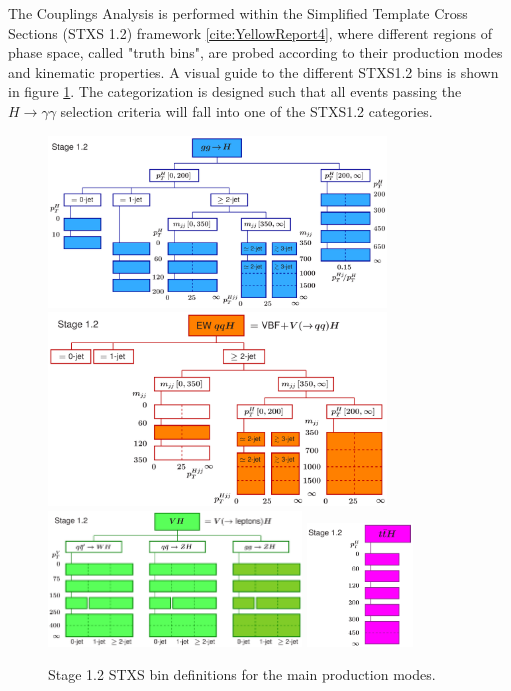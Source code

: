 The Couplings Analysis is performed within the Simplified Template Cross Sections (STXS 1.2) framework \ref{cite:YellowReport4}, where different regions of phase space, called "truth bins", are probed according to their production modes and kinematic properties. A visual guide to the different STXS1.2 bins is shown in figure \ref{fig:STXS_scheme}. The categorization is designed such that all events passing the $H \rightarrow \gamma \gamma$ selection criteria will fall into one of the STXS1.2 categories.

\begin{figure}[tbp]
  \centering
  \includegraphics[width=0.8\textwidth]{figures/theory_chapter/simplifiedXS_ggF_1_2} \\[3mm]
  \includegraphics[width=0.8\textwidth]{figures/theory_chapter/simplifiedXS_VBF_1_2} \\[3mm]
  \includegraphics[width=0.6\textwidth]{figures/theory_chapter/simplifiedXS_VH_1_2}
  \includegraphics[width=0.25\textwidth]{figures/theory_chapter/simplifiedXS_ttH_1_2}
  \caption{Stage 1.2 STXS bin definitions for the main production modes.}
  \label{fig:STXS_scheme}
\end{figure}


